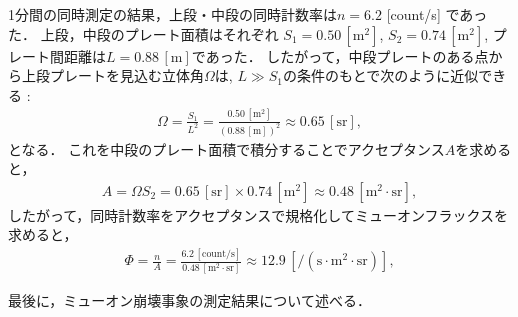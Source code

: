 \documentclass[uplatex,dvipdfmx,a4j,12pt]{jsarticle}
\begin{document}
1分間の同時測定の結果，上段・中段の同時計数率は$n = 6.2$ [count/s] であった．
上段，中段のプレート面積はそれぞれ $S_1 = 0.50 \,[\mathrm{m}^2]$, $S_2 = 0.74 \,[\mathrm{m}^2]$, プレート間距離は$L = 0.88 \,\mathrm{[m]}$であった．
したがって，中段プレートのある点から上段プレートを見込む立体角$\Omega$は, $L \gg S_1$の条件のもとで次のように近似できる :
\begin{gather}
  \Omega = \frac{S_1}{L^2} = \frac{0.50 \,[\mathrm{m}^2]}{(0.88 \,[\mathrm{m}])^2} \approx 0.65 \, [\mathrm{sr}],
\end{gather}
となる．
これを中段のプレート面積で積分することでアクセプタンス$A$を求めると，
\begin{gather}
  A = \Omega S_2 = 0.65 \, [\mathrm{sr}] \times 0.74 \, [\mathrm{m}^2] \approx 0.48 \, [\mathrm{m}^2 \cdot \mathrm{sr}],
\end{gather}
したがって，同時計数率をアクセプタンスで規格化してミューオンフラックスを求めると，
\begin{gather}
  \Phi = \frac{n}{A} = \frac{6.2 \, [\mathrm{count/s}]}{0.48 \, [\mathrm{m}^2 \cdot \mathrm{sr}]} \approx 12.9 \, [\mathrm{/(s\cdot m^2\cdot sr)}],
\end{gather}

\enskip

最後に，ミューオン崩壊事象の測定結果について述べる．
\end{document}
